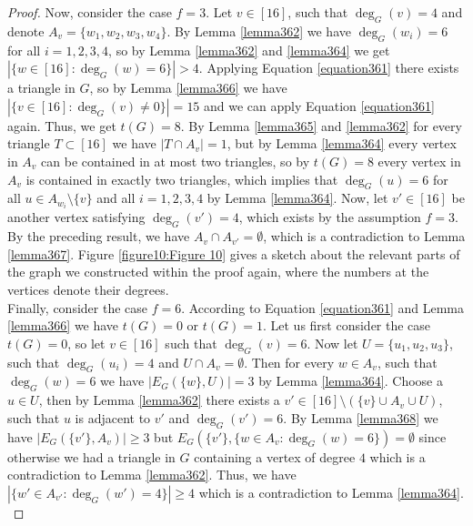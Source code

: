 \begin{thm}
\begin{proof}


Now, consider the case \(f=3\). Let \(v\in [16]\), such that \(\deg_G(v)=4\) and denote \(A_v=\{w_1,w_2,w_3,w_4\}\). By Lemma \ref{lemma362} we have \(\deg_G(w_i)=6\) for all \(i=1,2,3,4\), so by Lemma \ref{lemma362} and \ref{lemma364} we get \(|\{w\in [16]:\deg_G(w)=6\}|>4\). Applying Equation \ref{equation361} there exists a triangle in \(G\), so by Lemma \ref{lemma366} we have\\
\(|\{v\in [16]:\deg_G(v)\neq 0\}|=15\) and we can apply Equation \ref{equation361} again. Thus, we get \(t(G)=8\). By Lemma \ref{lemma365} and \ref{lemma362} for every triangle \(T\subset [16]\) we have \(|T\cap A_v|=1\), but by Lemma \ref{lemma364} every vertex in \(A_v\) can be contained in at most two triangles, so by \(t(G)=8\) every vertex in \(A_v\) is contained in exactly two triangles, which implies that \(\deg_G(u)=6\) for all \(u\in A_{w_i}\setminus\{v\}\) and all \(i=1,2,3,4\) by Lemma \ref{lemma364}. Now, let \(v'\in [16]\) be another vertex satisfying \(\deg_G(v')=4\), which exists by the assumption \(f=3\). By the preceding result, we have \(A_v\cap A_{v'}=\emptyset\), which is a contradiction to Lemma \ref{lemma367}. Figure \ref{figure10:Figure 10} gives a sketch about the relevant parts of the graph we constructed within the proof again, where the numbers at the vertices denote their degrees.\\



Finally, consider the case \(f=6\). According to Equation \ref{equation361} and Lemma \ref{lemma366} we have \(t(G)=0\) or \(t(G)=1\). Let us first consider the case \(t(G)=0\), so let \(v\in [16]\) such that \(\deg_G(v)=6\). Now let \(U=\{u_1,u_2,u_3\}\), such that \(\deg_G(u_i)=4\) and \(U\cap A_v=\emptyset\). Then for every \(w\in A_v\), such that \(\deg_G(w)=6\) we have \(|E_G(\{w\},U)|=3\) by Lemma \ref{lemma364}. Choose a \(u\in U\), then by Lemma \ref{lemma362} there exists a \(v'\in [16]\setminus (\{v\}\cup A_v\cup U)\), such that \(u\) is adjacent to \(v'\) and \(\deg_G(v')=6\). By Lemma \ref{lemma368} we have \(|E_G(\{v'\},A_v)|\geq 3\) but \(E_G(\{v'\},\{w\in A_v:\deg_G(w)=6\})=\emptyset\) since otherwise we had a triangle in \(G\) containing a vertex of degree \(4\) which is a contradiction to Lemma \ref{lemma362}. Thus, we have \(|\{w'\in A_{v'}:\deg_G(w')=4\}|\geq 4\) which is a contradiction to Lemma \ref{lemma364}.\\




\end{proof}
\end{thm}
